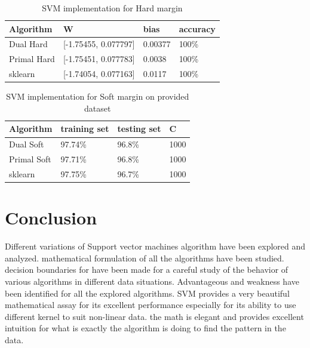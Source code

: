 \documentclass[10pt,onecolumn,letterpaper]{article}
\begin{document}
\begin{table}[htb]
\centering
\begin{tabular}{|l|l|l|l|} 
\toprule
Algorithm   & W                        & bias      & accuracy  \\ 
\hline
Dual Hard   & {[}-1.75455, 0.077797] & 0.00377 & 100\%     \\ 
\hline
Primal Hard & {[}-1.75451, 0.077783]  & 0.0038 & 100\%     \\ 
\hline
sklearn     & {[}-1.74054, 0.077163]  & 0.0117 & 100\%     \\
\bottomrule
\end{tabular}
\caption{SVM implementation for Hard margin}
\label{tab:SVM_hard}
\end{table}



\begin{table}[htb]
\centering
\begin{tabular}{|l|l|l|l|} 
\toprule
Algorithm   & training set & testing set & C     \\ 
\hline
Dual Soft   & 97.74\%      & 96.8\%      & 1000  \\ 
\hline
Primal Soft & 97.71\%      & 96.8\%      & 1000  \\ 
\hline
sklearn     & 97.75\%      & 96.7\%      & 1000  \\
\bottomrule
\end{tabular}
\caption{SVM implementation for Soft margin on provided dataset}
\label{tab:SVM_soft_data}
\end{table}

\section{Conclusion}
Different variations of Support vector machines algorithm have been explored and analyzed. mathematical formulation of all the algorithms have been studied. decision boundaries for have been made for a careful study of the behavior of various algorithms in different data situations. Advantageous and weakness have been identified for all the explored algorithms. SVM provides a very beautiful mathematical assay for its excellent performance especially for its ability to use different kernel to suit non-linear data. the math is elegant and provides excellent intuition for what is exactly the algorithm is doing to find the pattern in the data. 


 

\end{document}
